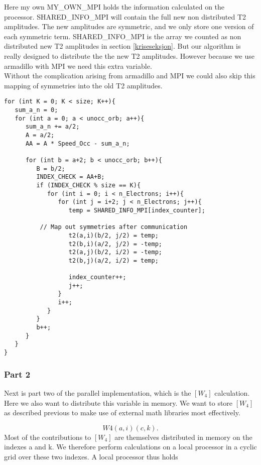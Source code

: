 Here my own MY\_OWN\_MPI holds the information calculated on the processor. SHARED\_INFO\_MPI will contain the full new non distributed T2 amplitudes. The new amplitudes are symmetric, and we only store one version of each symmetric term. SHARED\_INFO\_MPI is the array we counted as non distributed new T2 amplitudes in section \ref{kriseseksjon}. But our algorithm is really designed to distribute the the new T2 amplitudes. However because we use armadillo with MPI we need this extra variable.\\

Without the complication arising from armadillo and MPI we could also skip this mapping of symmetries into the old T2 amplitudes.

\begin{lstlisting}
for (int K = 0; K < size; K++){
   sum_a_n = 0;
   for (int a = 0; a < unocc_orb; a++){
      sum_a_n += a/2;
      A = a/2;
      AA = A * Speed_Occ - sum_a_n;

      for (int b = a+2; b < unocc_orb; b++){
         B = b/2;
         INDEX_CHECK = AA+B;
         if (INDEX_CHECK % size == K){
            for (int i = 0; i < n_Electrons; i++){
               for (int j = i+2; j < n_Electrons; j++){
                  temp = SHARED_INFO_MPI[index_counter];

          // Map out symmetries after communication
                  t2(a,i)(b/2, j/2) = temp;
                  t2(b,i)(a/2, j/2) = -temp;
                  t2(a,j)(b/2, i/2) = -temp;
                  t2(b,j)(a/2, i/2) = temp;

                  index_counter++;
                  j++;
               }
               i++;
            }
         }
         b++;
      }
   }
}
\end{lstlisting}

\subsubsection{Part 2}
Next is part two of the parallel implementation, which is the $[W_4]$ calculation. Here we also want to distribute this variable in memory. We want to store $[W_4]$ as described previous to make use of external math libraries most effectively.

\begin{equation}
W4(a,i)(c,k) .
\end{equation}
Most of the contributions to $[W_4]$ are themselves distributed in memory on the indexes a and k. We therefore perform calculations on a local processor in a cyclic grid over these two indexes. A local processor thus holds

